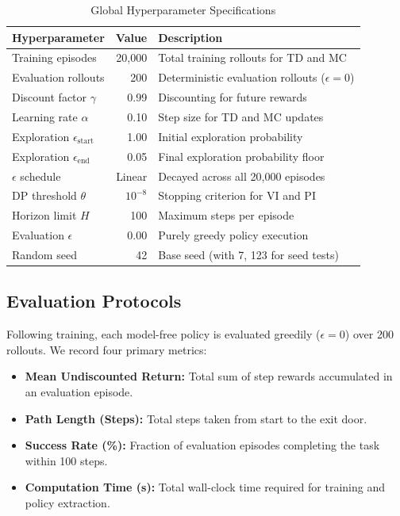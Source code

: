 \documentclass[10pt,conference]{IEEEtran}
\begin{document}
\begin{table}[htbp]
\caption{Global Hyperparameter Specifications}
\label{tab:hyperparams}
\centering
\begin{tabular}{lrl}
\toprule
\textbf{Hyperparameter} & \textbf{Value} & \textbf{Description} \\
\midrule
Training episodes & 20,000 & Total training rollouts for TD and MC \\
Evaluation rollouts & 200 & Deterministic evaluation rollouts ($\epsilon = 0$) \\
Discount factor $\gamma$ & 0.99 & Discounting for future rewards \\
Learning rate $\alpha$ & 0.10 & Step size for TD and MC updates \\
Exploration $\epsilon_{\text{start}}$ & 1.00 & Initial exploration probability \\
Exploration $\epsilon_{\text{end}}$ & 0.05 & Final exploration probability floor \\
$\epsilon$ schedule & Linear & Decayed across all 20,000 episodes \\
DP threshold $\theta$ & $10^{-8}$ & Stopping criterion for VI and PI \\
Horizon limit $H$ & 100 & Maximum steps per episode \\
Evaluation $\epsilon$ & 0.00 & Purely greedy policy execution \\
Random seed & 42 & Base seed (with 7, 123 for seed tests) \\
\bottomrule
\end{tabular}
\end{table}

\subsection{Evaluation Protocols}
Following training, each model-free policy is evaluated greedily ($\epsilon = 0$) over 200 rollouts. We record four primary metrics:
\begin{itemize}
    \item \textbf{Mean Undiscounted Return:} Total sum of step rewards accumulated in an evaluation episode.
    \item \textbf{Path Length (Steps):} Total steps taken from start to the exit door.
    \item \textbf{Success Rate (\%):} Fraction of evaluation episodes completing the task within 100 steps.
    \item \textbf{Computation Time (s):} Total wall-clock time required for training and policy extraction.
\end{itemize}
\end{document}
